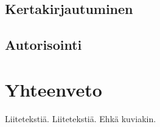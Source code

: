 \documentclass{tktltiki}
\begin{document}
\subsection{Kertakirjautuminen}

\subsection{Autorisointi}

\section{Yhteenveto}


\lastpage
\appendices
{}
Liitetekstiä.
Liitetekstiä. Ehkä kuviakin.
\end{document}
